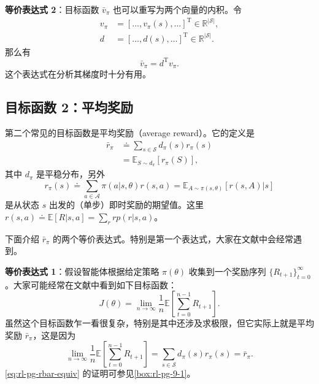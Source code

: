 \textbf{等价表达式 2}：目标函数 $\bar{v}_{\pi}$ 也可以重写为两个向量的内积。令
\begin{align}
v_{\pi} &= [\dots, v_{\pi}(s), \dots]^{\mathrm{T}} \in \mathbb{R}^{|\mathcal{S}|}, \\
d &= [\dots, d(s), \dots]^{\mathrm{T}} \in \mathbb{R}^{|\mathcal{S}|}.
\end{align}
那么有
\begin{equation}
\bar{v}_{\pi} = d^{\mathrm{T}} v_{\pi}.
\end{equation}
这个表达式在分析其梯度时十分有用。

\subsection*{目标函数 2：平均奖励}

第二个常见的目标函数是平均奖励（average reward）。它的定义是
\begin{equation}
\begin{aligned}
\bar{r}_{\pi} &\doteq \sum_{s \in \mathcal{S}} d_{\pi}(s) r_{\pi}(s) \\
&= \mathbb{E}_{S \sim d_{\pi}}[r_{\pi}(S)],
\end{aligned}
\label{eq:rl-pg-rbar-def}
\end{equation}
其中 $d_{\pi}$ 是平稳分布，另外
\begin{equation}
r_{\pi}(s) \doteq \sum_{a \in \mathcal{A}} \pi(a|s,\theta) r(s,a) = \mathbb{E}_{A \sim \pi(s,\theta)}[r(s,A)|s]
\label{eq:rl-pg-rpi-s}
\end{equation}
是从状态 $s$ 出发的（单步）即时奖励的期望值。这里 $r(s,a) \doteq \mathbb{E}[R|s,a] = \sum_r r p(r|s,a)$。

下面介绍 $\bar{r}_{\pi}$ 的两个等价表达式。特别是第一个表达式，大家在文献中会经常遇到。

\textbf{等价表达式 1}：假设智能体根据给定策略 $\pi(\theta)$ 收集到一个奖励序列 $\{R_{t+1}\}_{t=0}^{\infty}$。大家可能经常在文献中看到如下目标函数：
\begin{equation}
J(\theta) = \lim_{n \to \infty} \frac{1}{n} \mathbb{E}\left[ \sum_{t=0}^{n-1} R_{t+1} \right].
\label{eq:rl-pg-rbar-series}
\end{equation}
虽然这个目标函数乍一看很复杂，特别是其中还涉及求极限，但它实际上就是平均奖励 $\bar{r}_{\pi}$，这是因为
\begin{equation}
\lim_{n \to \infty} \frac{1}{n} \mathbb{E}\left[ \sum_{t=0}^{n-1} R_{t+1} \right] = \sum_{s \in \mathcal{S}} d_{\pi}(s) r_{\pi}(s) = \bar{r}_{\pi}.
\label{eq:rl-pg-rbar-equiv}
\end{equation}
\cref{eq:rl-pg-rbar-equiv} 的证明可参见\cref{box:rl-pg-9-1}。

